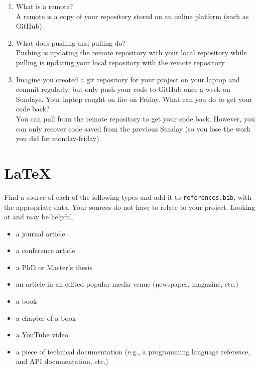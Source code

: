 \documentclass[10pt,twocolumn]{article}
\begin{document}
\begin{enumerate}
\item What is a remote?\\

A remote is a copy of your repository stored on an online platform (such as GitHub).\\

\item What does pushing and pulling do?\\

Pushing is updating the remote repository with your local repository while pulling is updating your local repository with the remote repository. \\

\item Imagine you created a git repository for your project on your laptop and commit regularly, but only push your code to GitHub once a week on Sundays. Your laptop caught on fire on Friday. What can you do to get your code back?\\

You can pull from the remote repository to get your code back. However, you can only recover code saved from the previous Sunday (so you lose the work you did for monday-friday).\\

\end{enumerate}

\section{\LaTeX}

Find a source of each of the following types and add it to \texttt{references.bib}, with the appropriate data. Your sources do not have to relate to your project. Looking at \textcite{OverleafBibliographyManagement} and \textcite{WikipediaBibtex} may be helpful,

\begin{itemize}
\item a journal article
\cite{Aryal2024}
\item a conference article
\cite{Shahpas2019}
\item a PhD or Master's thesis
\cite{Zhong2021}
\item an article in an edited popular media venue (newspaper, magazine, etc.)
\cite{Sciforce2022}
\item a book
\cite{Sotiropoulos2024}
\item a chapter of a book
\cite{SotiropoulosCH2024}
\item a YouTube video
\cite{Orchard2021}
\item a piece of technical documentation (e.g., a programming language reference, and API documentation, etc.)
\cite{TextAttack2021}
\end{itemize}
\end{document}
